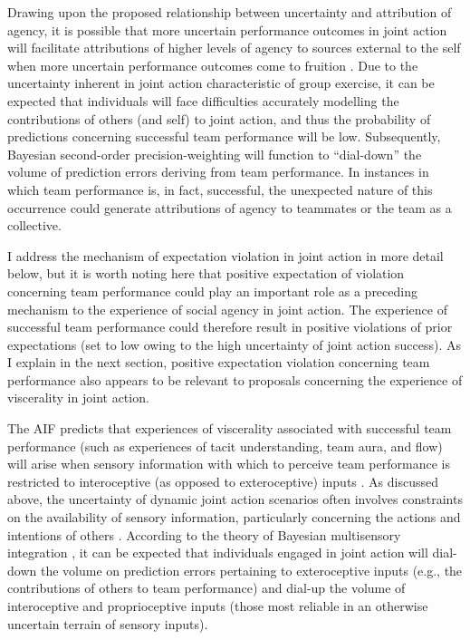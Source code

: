 \begin{CJK}{UTF8}{gbsn}
Drawing upon the proposed relationship between uncertainty and attribution of agency, it is possible that more uncertain performance outcomes in joint action will facilitate attributions of higher levels of agency to sources external to the self when more uncertain performance outcomes come to fruition \citep{Sato2005}.  Due to the uncertainty inherent in joint action characteristic of group exercise, it can be expected that individuals will face difficulties accurately modelling the contributions of others (and self) to joint action, and thus the probability of predictions concerning successful team performance will be low.
Subsequently, Bayesian second-order precision-weighting will function to ``dial-down'' the volume of prediction errors deriving from team performance.  In instances in which team performance is, in fact, successful, the unexpected nature of this occurrence could generate attributions of agency to teammates or the team as a collective.

I address the mechanism of expectation violation in joint action in more detail below, but it is worth noting here that positive expectation of violation concerning team performance could play an important role as a preceding mechanism to the experience of social agency in joint action.  The experience of successful team performance could therefore result in positive violations of prior expectations (set to low owing to the high uncertainty of joint action success).  As I explain in the next section, positive expectation violation concerning team performance also appears to be relevant to proposals concerning the experience of viscerality in joint action.


The AIF predicts that experiences of viscerality associated with successful team performance (such as experiences of tacit understanding, team aura, and flow) will arise when sensory information with which to perceive team performance is restricted to interoceptive (as opposed to exteroceptive) inputs \citep{Pezzulo2014}.  As discussed above, the uncertainty of dynamic joint action scenarios often involves constraints on the availability of sensory information, particularly concerning the actions and intentions of others \citep{Wolpert2003}.  According to the theory of Bayesian multisensory integration \citep{Ernst2004}, it can be expected that individuals engaged in joint action will dial-down the volume on prediction errors pertaining to exteroceptive inputs (e.g., the contributions of others to team performance) and dial-up the volume of interoceptive and proprioceptive inputs (those most reliable in an otherwise uncertain terrain of sensory inputs).


\end{CJK}
